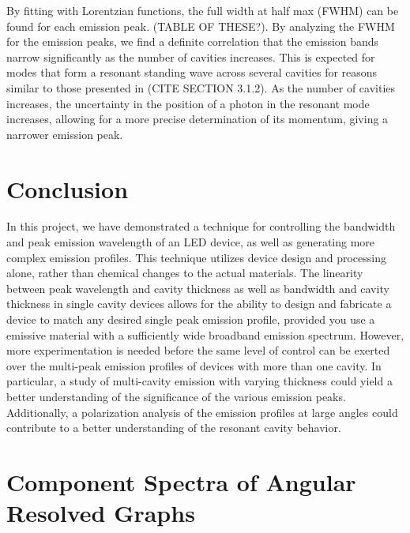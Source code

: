 \documentclass{report}
\begin{document}
        By fitting with Lorentzian functions, the full width at half max (FWHM) can be found for each emission peak. (TABLE OF THESE?). By analyzing the FWHM for the emission peaks, we find a definite correlation that the emission bands narrow significantly as the number of cavities increases. This is expected for modes that form a resonant standing wave across several cavities for reasons similar to those presented in (CITE SECTION 3.1.2). As the number of cavities increases, the uncertainty in the position of a photon in the resonant mode increases, allowing for a more precise determination of its momentum, giving a narrower emission peak.

\chapter{Conclusion} \label{concl}

    In this project, we have demonstrated a technique for controlling the bandwidth and peak emission wavelength of an LED device, as well as generating more complex emission profiles. This technique utilizes device design and processing alone, rather than chemical changes to the actual materials. The linearity between peak wavelength and cavity thickness as well as bandwidth and cavity thickness in single cavity devices allows for the ability to design and fabricate a device to match any desired single peak emission profile, provided you use a emissive material with a sufficiently wide broadband emission spectrum. However, more experimentation is needed before the same level of control can be exerted over the multi-peak emission profiles of devices with more than one cavity. In particular, a study of multi-cavity emission with varying thickness could yield a better understanding of the significance of the various emission peaks. Additionally, a polarization analysis of the emission profiles at large angles could contribute to a better understanding of the resonant cavity behavior.

\appendix
\chapter{Component Spectra of Angular Resolved Graphs} \label{components}
\end{document}
